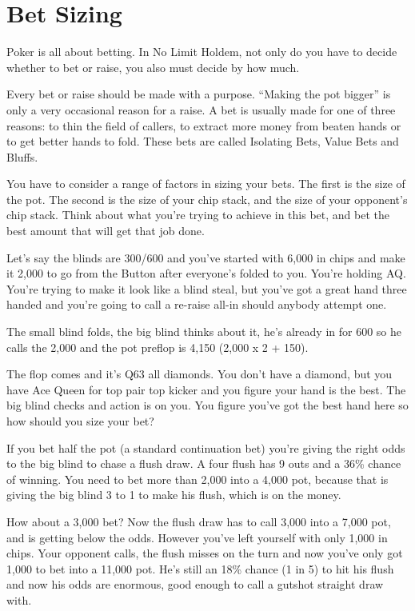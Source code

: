 \chapter{Bet Sizing}


Poker is all about betting. In No Limit Holdem, not only do you have to
decide whether to bet or raise, you also must decide by how much.

Every bet or raise should be made with a purpose. ``Making the pot
bigger'' is only a very occasional reason for a raise. A bet
is usually made for one of three reasons: to thin the field of callers,
to extract more money from beaten hands or to get better hands to fold.
These bets are called Isolating Bets, Value Bets and Bluffs.

You have to consider a range of factors in sizing your bets. The first is
the size of the pot. The second is the size of your chip stack, and
the size of your opponent's chip stack. Think about
what you're trying to achieve in this bet, and bet the best amount
that will get that job done.

Let's say the blinds are 300/600 and you've started with 6,000 in chips
and make it 2,000 to go from the Button after everyone's folded to you.
You're holding AQ. You're trying to make it look like a blind steal, but
you've got a great hand three handed and you're going to call a re-raise
all-in should anybody attempt one.

The small blind folds, the big blind thinks about it, he's already in
for 600 so he calls the 2,000 and the pot preflop is 4,150 (2,000 x 2 + 150).

The flop comes and it's Q63 all diamonds. You don't have a diamond, but
you have Ace Queen for top pair top kicker and you figure your hand
is the best. The big blind checks and action is on you. You figure you've
got the best hand here so how should you size your bet?

If you bet half the pot (a standard continuation bet) you're giving the
right odds to the big blind to chase a flush draw. A four flush has 9 outs
and a 36\% chance of winning. You need to bet more than 2,000 into a 4,000 pot,
because that is giving the big blind 3 to 1 to make his flush, which is
on the money.

How about a 3,000 bet? Now the flush draw has to call 3,000 into a 7,000 pot,
and is getting below the odds. However you've left yourself with
only 1,000 in chips. Your opponent calls, the flush misses on the turn and
now you've only got 1,000 to bet into a 11,000 pot. He's still an 18\% chance
(1 in 5) to hit his flush and now his odds are enormous, good enough to
call a gutshot straight draw with.

